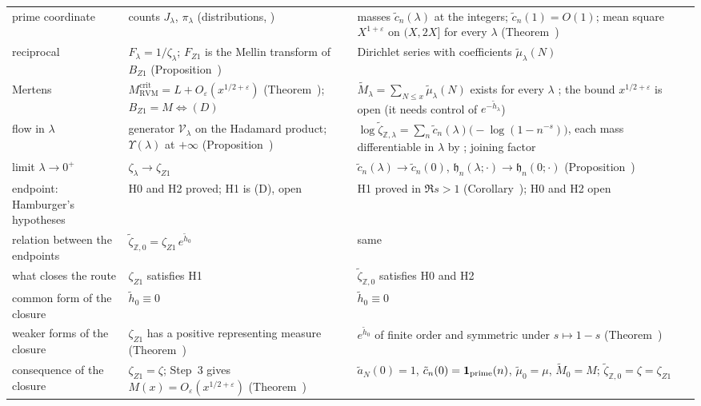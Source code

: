 \documentclass[11pt,reqno]{amsart}
\makeatletter
\let\CG@origref\ref
\let\CG@origeqref\eqref
\newcommand{\CG@gettip}[1]{\@ifundefined{CGTip@#1}{Reference: #1}{\csname CGTip@#1\endcsname}}
\DeclareRobustCommand{\CGref}[1]{\pdftooltip{\CG@origref{#1}}{\CG@gettip{#1}}}
\DeclareRobustCommand{\CGeqref}[1]{\pdftooltip{\CG@origeqref{#1}}{\CG@gettip{#1}}}
\numberwithin{equation}{section}
\theoremstyle{plain}
\theoremstyle{definition}
\theoremstyle{remark}
\newcommand{\Z}{\mathbb Z}
\newcommand{\eps}{\varepsilon}
\newcommand{\RVM}{\mathrm{RVM}}
\newcommand{\crit}{\mathrm{crit}}
\makeatother
\begin{document}
\begin{longtable}{>{\raggedright\arraybackslash}p{}>{\raggedright\arraybackslash}p{}>{\raggedright\arraybackslash}p{}}
prime coordinate & counts $J_\lambda$, $\pi_\lambda$ (distributions, \CGeqref{eq:J-X}) & masses $\tilde c_n(\lambda)$ at the integers; $\tilde c_n(1)=O(1)$; mean square $X^{1+\eps}$ on $(X,2X]$ for every $\lambda$ (Theorem~\CGref{thm:mean-square-cells})\\
reciprocal & $F_\lambda=1/\zeta_\lambda$; $F_{Z1}$ is the Mellin transform of $B_{Z1}$ (Proposition~\CGref{prop:Mellin-Mertens}) & Dirichlet series with coefficients $\tilde\mu_\lambda(N)$ \CGeqref{eq:atomized-mobius}\\
Mertens & $M^{\crit}_{\RVM}=L+O_\eps(x^{1/2+\eps})$ (Theorem~\CGref{thm:unsmoothed-RVM}); $B_{Z1}=M\iff(D)$ & $\tilde M_\lambda=\sum_{N\le x}\tilde\mu_\lambda(N)$ exists for every $\lambda$ \CGeqref{eq:atomized-mertens}; the bound $x^{1/2+\eps}$ is open (it needs control of $e^{-\tilde h_\lambda}$)\\
flow in $\lambda$ & generator $\mathcal V_\lambda$ on the Hadamard product; $\Upsilon(\lambda)$ at $+\infty$ (Proposition~\CGref{prop:family-flow}) & $\log\tilde\zeta_{\Z,\lambda}=\sum_n\tilde c_n(\lambda)\bigl(-\log(1-n^{-s})\bigr)$, each mass differentiable in $\lambda$ by \CGeqref{eq:J-lambda-derivative}; joining factor \CGeqref{eq:joining-derivative}\\
limit $\lambda\to0^+$ & $\zeta_\lambda\to\zeta_{Z1}$ & $\tilde c_n(\lambda)\to\tilde c_n(0)$, $\mathfrak h_n(\lambda;\cdot)\to\mathfrak h_n(0;\cdot)$ (Proposition~\CGref{prop:cell-limit})\\
endpoint: Hamburger's hypotheses & H0 and H2 proved; H1 is (D), open & H1 proved in $\Re s>1$ (Corollary~\CGref{cor:abscissa-one}); H0 and H2 open\\
relation between the endpoints & $\tilde\zeta_{\Z,0}=\zeta_{Z1}\,e^{\tilde h_0}$ & same\\
what closes the route & $\zeta_{Z1}$ satisfies H1 & $\tilde\zeta_{\Z,0}$ satisfies H0 and H2\\
common form of the closure & $\tilde h_0\equiv0$ & $\tilde h_0\equiv0$\\
weaker forms of the closure & $\zeta_{Z1}$ has a positive representing measure (Theorem~\CGref{thm:positivity}) & $e^{\tilde h_0}$ of finite order and symmetric under $s\mapsto1-s$ (Theorem~\CGref{thm:pair-criterion})\\
consequence of the closure & $\zeta_{Z1}=\zeta$; Step~3 gives $M(x)=O_\eps(x^{1/2+\eps})$ (Theorem~\CGref{thm:step3}) & $\tilde a_N(0)=1$, $\tilde c_n(0)=\mathbf 1_{\rm prime}(n)$, $\tilde\mu_0=\mu$, $\tilde M_0=M$; $\tilde\zeta_{\Z,0}=\zeta=\zeta_{Z1}$\\
\end{longtable}
\endgroup
\end{document}
